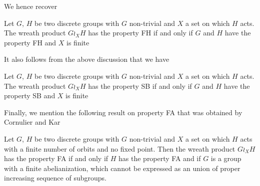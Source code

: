 We hence recover
\begin{prop}
Let $G$, $H$ be two discrete groups with $G$ non-trivial and $X$ a set on which $H$ acts. The wreath product $G \wr_X H$ has the property FH if and only if $G$ and $H$ have the property FH and $X$ is finite
\end{prop}
%
It also follows from the above discussion that we have
\begin{prop}
Let $G$, $H$ be two discrete groups with $G$ non-trivial and $X$ a set on which $H$ acts. The wreath product $G \wr_X H$ has the property SB if and only if $G$ and $H$ have the property SB and $X$ is finite
\end{prop}
%
%
Finally, we mention the following result on property FA that was obtained by Cornulier and Kar
\begin{thm}
Let $G$, $H$ be two discrete groups with $G$ non-trivial and $X$ a set on which $H$ acts with a finite number of orbits and no fixed point. Then the wreath product $G \wr_X H$ has the property FA if and only if $H$ has the property FA and if $G$ is a group with a finite abelianization, which cannot be expressed as an union of proper increasing sequence of subgroups.
\end{thm}

